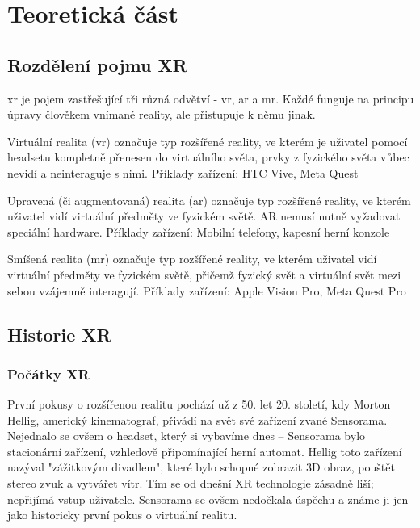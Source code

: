 \part{Teoretická část}

\chapter{Rozdělení pojmu XR}

\gls{xr} je pojem zastřešující tři různá odvětví - \gls{vr}, \gls{ar} a \gls{mr}. Každé funguje na principu úpravy člověkem vnímané reality, ale přistupuje k němu jinak.

Virtuální realita (\gls{vr}) označuje typ rozšířené reality, ve kterém je uživatel pomocí headsetu kompletně přenesen do virtuálního světa, prvky z fyzického světa vůbec nevidí a neinteraguje s nimi. Příklady zařízení: HTC Vive, Meta Quest

Upravená (či augmentovaná) realita (\gls{ar}) označuje typ rozšířené reality, ve kterém uživatel vidí virtuální předměty ve fyzickém světě. AR nemusí nutně vyžadovat speciální hardware. Příklady zařízení: Mobilní telefony, kapesní herní konzole

Smíšená realita (\gls{mr}) označuje typ rozšířené reality, ve kterém uživatel vidí virtuální předměty ve fyzickém světě, přičemž fyzický svět a virtuální svět mezi sebou vzájemně interagují. Příklady zařízení: Apple Vision Pro, Meta Quest Pro \cite{xr_disambiguation}

\chapter{Historie XR}

\section{Počátky XR}

První pokusy o rozšířenou realitu pochází už z 50. let 20. století, kdy Morton Hellig, americký kinematograf, přivádí na svět své zařízení zvané Sensorama. Nejednalo se ovšem o headset, který si vybavíme dnes -- Sensorama bylo stacionární zařízení, vzhledově připomínající herní automat. Hellig toto zařízení nazýval "zážitkovým divadlem", které bylo schopné zobrazit 3D obraz, pouštět stereo zvuk a vytvářet vítr. Tím se od dnešní XR technologie zásadně liší; nepřijímá vstup uživatele. Sensorama se ovšem nedočkala úspěchu a známe ji jen jako historicky první pokus o virtuální realitu. \cite{otechnice}

